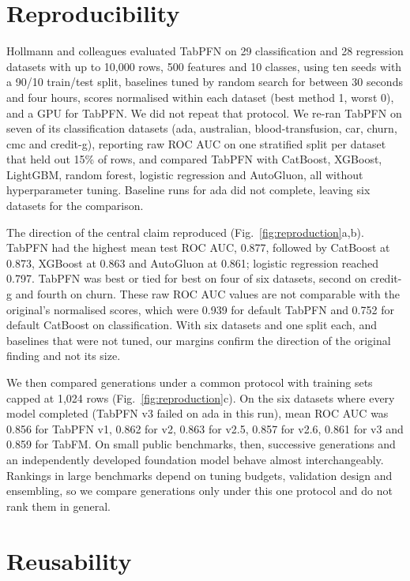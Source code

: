 \documentclass[pdflatex,sn-nature]{sn-jnl}
\begin{document}
\section*{Reproducibility}

Hollmann and colleagues evaluated TabPFN on 29 classification and 28 regression datasets with up to 10,000 rows, 500 features and 10 classes, using ten seeds with a 90/10 train/test split, baselines tuned by random search for between 30 seconds and four hours, scores normalised within each dataset (best method 1, worst 0), and a GPU for TabPFN.\citep{hollmann2025accurate} We did not repeat that protocol. We re-ran TabPFN on seven of its classification datasets (ada, australian, blood-transfusion, car, churn, cmc and credit-g), reporting raw ROC AUC on one stratified split per dataset that held out 15\% of rows, and compared TabPFN with CatBoost, XGBoost, LightGBM, random forest, logistic regression and AutoGluon, all without hyperparameter tuning. Baseline runs for ada did not complete, leaving six datasets for the comparison.

The direction of the central claim reproduced (Fig.~\ref{fig:reproduction}a,b). TabPFN had the highest mean test ROC AUC, 0.877, followed by CatBoost at 0.873, XGBoost at 0.863 and AutoGluon at 0.861; logistic regression reached 0.797. TabPFN was best or tied for best on four of six datasets, second on credit-g and fourth on churn. These raw ROC AUC values are not comparable with the original's normalised scores, which were 0.939 for default TabPFN and 0.752 for default CatBoost on classification.\citep{hollmann2025accurate} With six datasets and one split each, and baselines that were not tuned, our margins confirm the direction of the original finding and not its size.

We then compared generations under a common protocol with training sets capped at 1,024 rows (Fig.~\ref{fig:reproduction}c). On the six datasets where every model completed (TabPFN v3 failed on ada in this run), mean ROC AUC was 0.856 for TabPFN v1, 0.862 for v2, 0.863 for v2.5, 0.857 for v2.6, 0.861 for v3 and 0.859 for TabFM. On small public benchmarks, then, successive generations and an independently developed foundation model behave almost interchangeably. Rankings in large benchmarks depend on tuning budgets, validation design and ensembling,\citep{erickson2025tabarena,qu2025tabicl} so we compare generations only under this one protocol and do not rank them in general.



\section*{Reusability}
\end{document}
